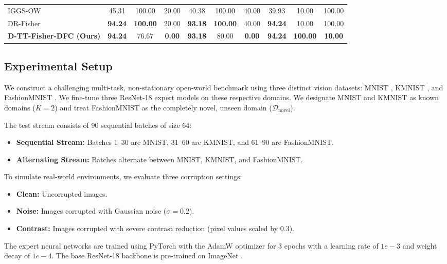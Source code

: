 \documentclass{article}
\theoremstyle{plain}
\theoremstyle{definition}
\theoremstyle{remark}
\begin{document}
\begin{table}[t]
\begin{center}
\begin{small}
\begin{tabular}{l|ccc|ccc|ccc}
IGGS-OW \cite{iggs_ow} & 45.31 & 100.00 & 20.00 & 40.38 & 100.00 & 40.00 & 39.93 & 10.00 & 100.00 \\
DR-Fisher \cite{dr_fisher} & \textbf{94.24} & \textbf{100.00} & 20.00 & \textbf{93.18} & \textbf{100.00} & 40.00 & \textbf{94.24} & 10.00 & 100.00 \\
\textbf{D-TT-Fisher-DFC (Ours)} & \textbf{94.24} & 76.67 & \textbf{0.00} & \textbf{93.18} & 80.00 & \textbf{0.00} & \textbf{94.24} & \textbf{100.00} & \textbf{10.00} \\
\bottomrule
\end{tabular}
\end{small}
\end{center}
\vskip -0.1in
\end{table}

\subsection{Experimental Setup}
We construct a challenging multi-task, non-stationary open-world benchmark using three distinct vision datasets: MNIST \cite{lecun1998gradient}, KMNIST \cite{clanuwat2018deep}, and FashionMNIST \cite{xiao2017fashion}. We fine-tune three ResNet-18 \cite{he2016deep} expert models on these respective domains. We designate MNIST and KMNIST as known domains ($K=2$) and treat FashionMNIST as the completely novel, unseen domain ($\mathcal{D}_{\text{novel}}$).

The test stream consists of 90 sequential batches of size 64:
\begin{itemize}
  \item \textbf{Sequential Stream:} Batches 1--30 are MNIST, 31--60 are KMNIST, and 61--90 are FashionMNIST.
  \item \textbf{Alternating Stream:} Batches alternate between MNIST, KMNIST, and FashionMNIST.
\end{itemize}
To simulate real-world environments, we evaluate three corruption settings:
\begin{itemize}
  \item \textbf{Clean:} Uncorrupted images.
  \item \textbf{Noise:} Images corrupted with Gaussian noise ($\sigma = 0.2$).
  \item \textbf{Contrast:} Images corrupted with severe contrast reduction (pixel values scaled by $0.3$).
\end{itemize}

The expert neural networks are trained using PyTorch \cite{paszke2019pytorch} with the AdamW optimizer \cite{loshchilov2017decoupled} for 3 epochs with a learning rate of $1e-3$ and weight decay of $1e-4$. The base ResNet-18 backbone is pre-trained on ImageNet \cite{deng2009imagenet}.
\end{document}
